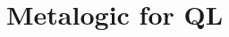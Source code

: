 ﻿%


\setcounter{section}{12}
\section{Metalogic for QL}

\begin{frame}

\scriptsize{\tableofcontents}

\end{frame}


